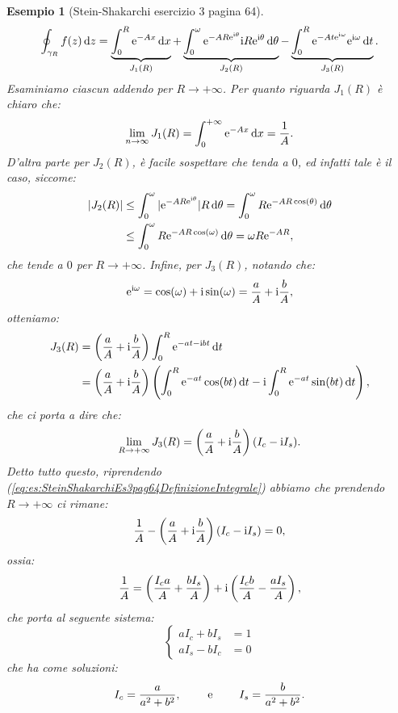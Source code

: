 \documentclass[11pt]{book}
\theoremstyle{Definizione}
\theoremstyle{TeoremaProposizioneLemmaCorollarioCongettura}
\theoremstyle{OsservazioneNotaEsempio}
\newtheorem{myes}{Esempio}[section]
\renewcommand{\i}{\textup{i}}
\newcommand{\e}{\textup{e}}
\renewcommand{\d}{\mathrm{d}}
\newcommand{\dz}{\,\d z}
\newcommand{\dt}{\,\d t}
\newcommand{\dx}{\,\d x}
\newcommand{\dtheta}{\, \d \theta}
\begin{document}
\begin{myes}[Stein-Shakarchi esercizio 3 pagina 64]
\begin{equation}\label{eq:es:SteinShakarchiEs3pag64DefinizioneIntegrale}
\oint_{\gamma_R} f(z)\dz = \underbrace{\int_0^R \e^{-Ax}\dx}_{J_1(R)} + \underbrace{\int_0^{\omega} \e^{-AR\e^{\i\theta}}\i R \e^{\i\theta}\dtheta}_{J_2(R)} - \underbrace{\int_0^R \e^{-At\e^{\i\omega}}\e^{\i\omega}\dt}_{J_3(R)}.
\end{equation}
Esaminiamo ciascun addendo per $R \to +\infty$. Per quanto riguarda $J_1(R)$ è chiaro che:
$$
\lim_{n \to \infty} J_1(R) = \int_0^{+\infty} \e^{-Ax}\dx = \frac{1}{A}.
$$
D'altra parte per $J_2(R)$, è facile sospettare che tenda a $0$, ed infatti tale è il caso, siccome:
\begin{align*}
|J_2(R)| &\leq \int_0^\omega |\e^{-AR \e^{\i\theta}}|R\dtheta = \int_0^\omega R \e^{-AR\cos(\theta)}\dtheta \\
&\leq \int_0^{\omega} R \e^{-AR\cos(\omega)}\dtheta = \omega R \e^{-AR},
\end{align*}
che tende a $0$ per $R \to +\infty$. Infine, per $J_3(R)$, notando che:
$$
\e^{\i\omega} = \cos(\omega) + \i \sin(\omega ) = \frac{a}{A}+\i \frac{b}{A},
$$
otteniamo:
\begin{align*}
J_3(R) &=\left(\frac{a}{A}+\i \frac{b}{A}\right)\int_0^R \e^{-at-\i bt}\dt\\
&= \left(\frac{a}{A}+\i \frac{b}{A}\right)\left(\int_0^R \e^{-at}\cos(bt)\dt - \i\int_0^R \e^{-at}\sin(bt)\dt\right),
\end{align*}
che ci porta a dire che:
$$
\lim_{ R \to +\infty} J_3(R) = \left(\frac{a}{A}+\i \frac{b}{A}\right)(I_c-\i I_s).
$$
Detto tutto questo, riprendendo (\ref{eq:es:SteinShakarchiEs3pag64DefinizioneIntegrale}) abbiamo che prendendo $R \to +\infty$ ci rimane:
$$
\frac{1}{A}-\left(\frac{a}{A}+\i \frac{b}{A}\right)(I_c- \i I_s) = 0,
$$
ossia:
$$
\frac{1}{A} = \left(\frac{I_c a}{A}+\frac{b I_s}{A}\right)+\i \left(\frac{I_c b}{A}-\frac{a I_s}{A}\right),
$$
che porta al seguente sistema:
$$
\begin{cases}
a I_c + b I_s &= 1 \\
a I_s -b I_c &= 0
\end{cases}
$$
che ha come soluzioni:
$$
I_c = \frac{a}{a^2+b^2},\qquad \textup{ e }\qquad I_s = \frac{b}{a^2+b^2}.
$$

\end{myes}
\end{document}
